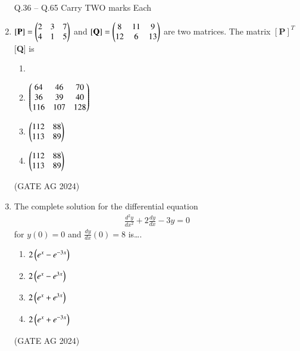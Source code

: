 \documentclass[journal]{IEEEtran}
\begin{document}
\begin{enumerate}
 \medskip


\noindent Q.36 -- Q.65 Carry TWO marks Each

 \medskip

\item 
$[\mathbf{P}] = \begin{pmatrix}2 & 3 & 7 \\ 4 & 1 & 5\end{pmatrix} $ and $[\mathbf{Q}] = \begin{pmatrix}8 & 11 & 9 \\ 12 & 6 & 13\end{pmatrix}$ are two matrices. The matrix $[\mathbf{P}]^{T}$[\textbf{Q}] is\\[1em]
\begin{enumerate}
\item  {}
\item  $\begin{pmatrix}64 & 46 & 70 \\ 36 & 39 & 40 \\ 116 & 107 & 128\end{pmatrix}$ 
\item $\begin{pmatrix}112 & 88 \\ 113 & 89 \end{pmatrix}$ 
\item $\begin{pmatrix}112 & 88 \\ 113 & 89\end{pmatrix}$
\end{enumerate}
 \hfill(GATE AG 2024)\\

 \medskip

\item 
The complete solution for the differential equation
\begin{align*}
\frac{d^2y}{dx^2} + 2\frac{dy}{dx} - 3y = 0
\end{align*}
for $y(0) = 0$ and $\frac{dy}{dx}(0) = 8$ is\dots.

\begin{enumerate}
\item $2\left(e^x - e^{-3x}\right)$ 
\item $2\left(e^x - e^{3x}\right)$ 
\item $2\left(e^x + e^{3x}\right)$
\item $2\left(e^x + e^{-3x}\right)$
\end{enumerate}
 \hfill(GATE AG 2024)\\

 \medskip


\end{enumerate}
\end{document}
